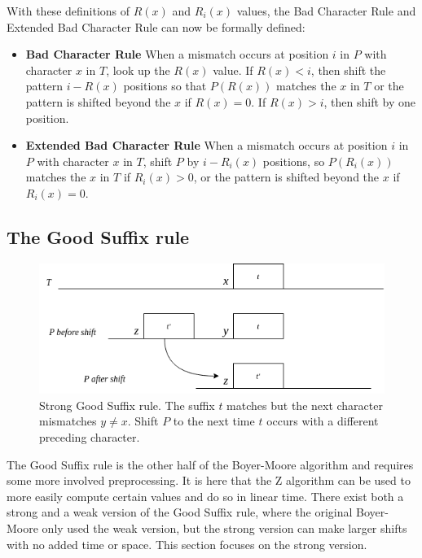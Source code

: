 
With these definitions of $R(x)$ and $R_i(x)$ values, the Bad Character Rule and Extended Bad Character Rule can now be formally defined:

\begin{itemize}
    \item[] \textbf{Bad Character Rule} When a mismatch occurs at position $i$ in $P$ with character $x$ in $T$, look up the $R(x)$ value. If $R(x)<i$, then shift the pattern $i-R(x)$ positions so that $P(R(x))$ matches the $x$ in $T$ or the pattern is shifted beyond the $x$ if $R(x)=0$. If $R(x)>i$, then shift by one position. 
    \item[] \textbf{Extended Bad Character Rule} When a mismatch occurs at position $i$ in $P$ with character $x$ in $T$, shift $P$ by $i-R_i(x)$ positions, so $P(R_i(x))$ matches the $x$ in $T$ if $R_i(x)>0$, or the pattern is shifted beyond the $x$ if $R_i(x)=0$. 
\end{itemize}

\subsection{The Good Suffix rule}

\begin{figure}[b!]
    \centering
    \includegraphics[width=\textwidth]{LaTeX/Figures/Zalg/suffixrule.png}
    \caption{Strong Good Suffix rule. The suffix $t$ matches but the next character mismatches $y\neq x$. Shift $P$ to the next time $t$ occurs with a different preceding character. }
    \label{fig:suffixrule}
\end{figure}

The Good Suffix rule is the other half of the Boyer-Moore algorithm and requires some more involved preprocessing. It is here that the Z algorithm can be used to more easily compute certain values and do so in linear time. There exist both a strong and a weak version of the Good Suffix rule, where the original Boyer-Moore only used the weak version\cite{Gusfield1997AlgorithmsOS}, but the strong version can make larger shifts with no added time or space. This section focuses on the strong version. 

